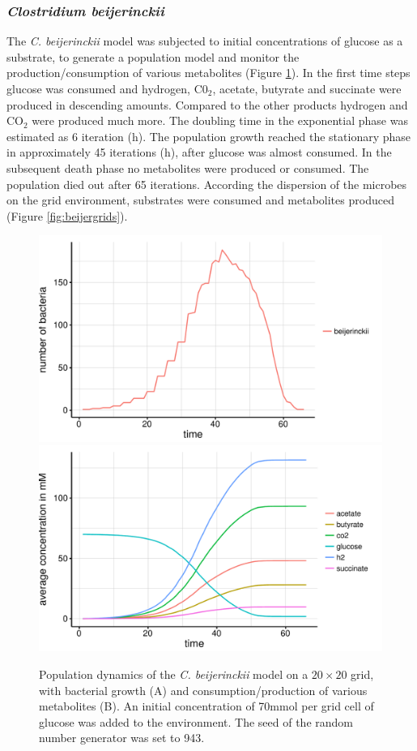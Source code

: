 \subsubsection{\textit{Clostridium beijerinckii}}
The \textit{C. beijerinckii} model was subjected to initial concentrations of glucose as a substrate, to generate a population model and monitor the production/consumption of various metabolites (Figure \hyperref[fig:beijersg]{\ref{fig:beijersg}}). In the first time steps glucose was consumed and hydrogen, C0$_2$, acetate, butyrate and succinate were produced in descending amounts. 
Compared to the other products hydrogen and CO$_2$ were produced much more.
The doubling time in the exponential phase was estimated as 6 iteration (h).
The population growth reached the stationary phase in approximately 45 iterations (h), after glucose was almost consumed. In the subsequent death phase no metabolites were produced or consumed. The population died out after 65 iterations.
According the dispersion of the microbes on the grid environment, substrates were consumed and metabolites produced (Figure \hyperref[fig:beijergrids]{\ref{fig:beijergrids}}).
\begin{figure}[h!]
  \centering
    \includegraphics[scale=0.45]{../results/img/beijerinckii_20x20_seed943_growth.pdf}
    \includegraphics[scale=0.45]{../results/img/beijerinckii_20x20_seed943_subs.pdf}
  \caption{Population dynamics of the \emph{C. beijerinckii} model on a $20\times20$ grid, with bacterial growth (A) and consumption/production of various metabolites (B). An initial concentration of 70\;mmol per grid cell of glucose was added to the environment. The seed of the random number generator was set to 943.}
  \label{fig:beijersg}
\end{figure}
